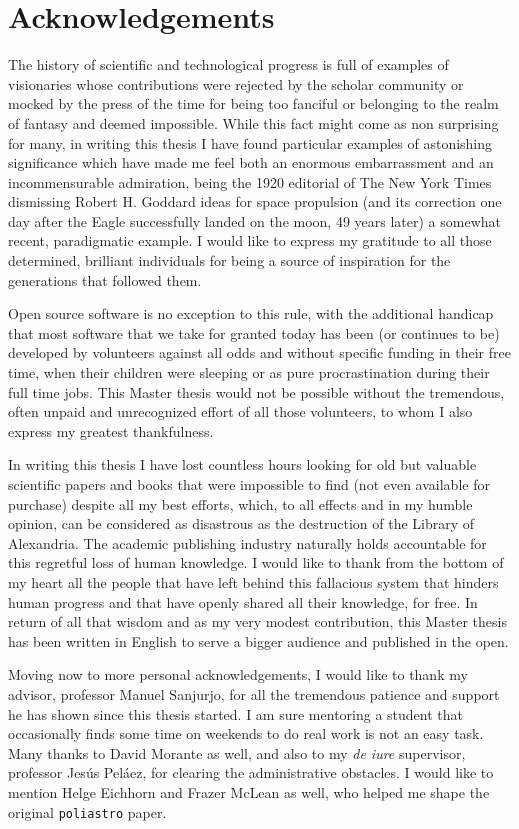 \chapter*{Acknowledgements}

The history of scientific and technological progress is full of examples of visionaries whose contributions were rejected by the scholar community or mocked by the press of the time for being too fanciful or belonging to the realm of fantasy and deemed impossible. While this fact might come as non surprising for many, in writing this thesis I have found particular examples of astonishing significance which have made me feel both an enormous embarrassment and an incommensurable admiration, being the 1920 editorial of The New York Times dismissing Robert H. Goddard ideas for space propulsion (and its correction one day after the Eagle successfully landed on the moon, 49 years later) a somewhat recent, paradigmatic example. I would like to express my gratitude to all those determined, brilliant individuals for being a source of inspiration for the generations that followed them.

Open source software is no exception to this rule, with the additional handicap that most software that we take for granted today has been (or continues to be) developed by volunteers against all odds and without specific funding in their free time, when their children were sleeping or as pure procrastination during their full time jobs. This Master thesis would not be possible without the tremendous, often unpaid and unrecognized effort of all those volunteers, to whom I also express my greatest thankfulness.

In writing this thesis I have lost countless hours looking for old but valuable scientific papers and books that were impossible to find (not even available for purchase) despite all my best efforts, which, to all effects and in my humble opinion, can be considered as disastrous as the destruction of the Library of Alexandria. The academic publishing industry naturally holds accountable for this regretful loss of human knowledge. I would like to thank from the bottom of my heart all the people that have left behind this fallacious system that hinders human progress and that have openly shared all their knowledge, for free. In return of all that wisdom and as my very modest contribution, this Master thesis has been written in English to serve a bigger audience and published in the open.

Moving now to more personal acknowledgements, I would like to thank my advisor, professor Manuel Sanjurjo, for all the tremendous patience and support he has shown since this thesis started. I am sure mentoring a student that occasionally finds some time on weekends to do real work is not an easy task. Many thanks to David Morante as well, and also to my \textit{de iure} supervisor, professor Jesús Peláez, for clearing the administrative obstacles. I would like to mention Helge Eichhorn and Frazer McLean as well, who helped me shape the original \verb|poliastro| paper.


